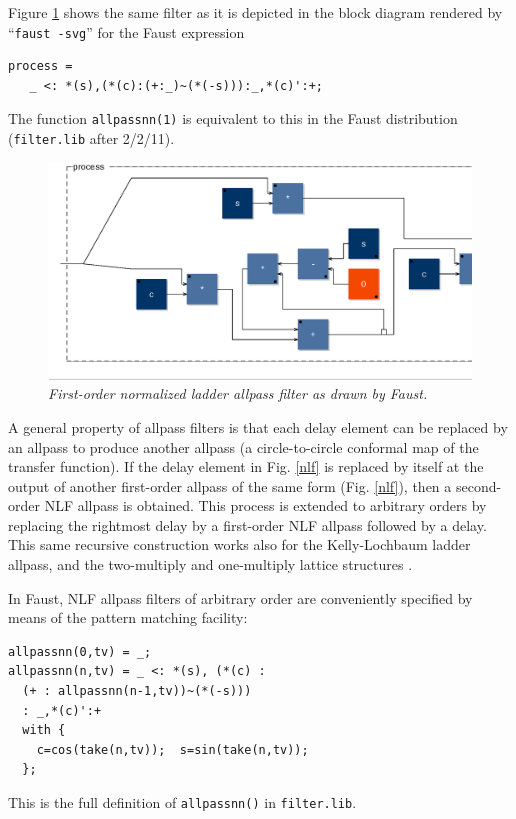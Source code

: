 \documentclass[twoside,a4paper]{article}
\begin{document}
Figure \ref{nlf1} shows the same filter as it is depicted in the block diagram
rendered by ``\texttt{faust -svg}'' for the Faust expression
\begin{verbatim}
process = 
   _ <: *(s),(*(c):(+:_)~(*(-s))):_,*(c)':+;
\end{verbatim}
The function \texttt{allpassnn(1)} is equivalent to this in the Faust
distribution (\texttt{filter.lib} after 2/2/11).

\begin{figure}[ht]
\centerline{\includegraphics[scale=0.33]{eps/nlf1.eps}}
\caption{\label{nlf1}{\it First-order normalized ladder allpass filter as drawn by Faust.}}
\end{figure}

A general property of allpass filters is that each delay element can
be replaced by an allpass to produce another allpass (a
circle-to-circle conformal map of the transfer function).  If the
delay element in Fig.{} \ref{nlf} is replaced by itself at the output
of another first-order allpass of the same form (Fig.{} \ref{nlf}),
then a second-order NLF allpass is obtained.  This process is extended
to arbitrary orders by replacing the rightmost delay by a first-order
NLF allpass followed by a delay.  This same recursive construction
works also for the Kelly-Lochbaum ladder allpass, and the
two-multiply and one-multiply lattice structures \cite{MG,PASP}.

In Faust, NLF allpass filters of arbitrary order are conveniently
specified by means of the pattern matching facility:
\begin{samepage}
\begin{verbatim}
allpassnn(0,tv) = _;
allpassnn(n,tv) = _ <: *(s), (*(c) : 
  (+ : allpassnn(n-1,tv))~(*(-s))) 
  : _,*(c)':+
  with { 
    c=cos(take(n,tv));  s=sin(take(n,tv)); 
  };
\end{verbatim}
\end{samepage}
This is the full definition of \texttt{allpassnn()} in 
\texttt{filter.lib}.
\end{document}

